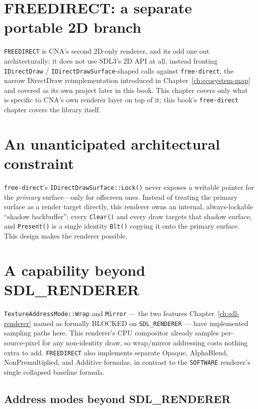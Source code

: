 \section{FREEDIRECT: a separate portable 2D branch}

\texttt{FREEDIRECT} is CNA's second 2D-only renderer, and its odd one out architecturally: it does
not use SDL3's 2D API at all, instead fronting \texttt{IDirectDraw} / \texttt{IDirectDrawSurface}-shaped
calls against \texttt{free-direct}, the narrow DirectDraw reimplementation introduced in
Chapter~\ref{ch:ecosystem-map} and covered as its own project later in this book. This chapter
covers only what is specific to CNA's own renderer layer on top of it; this book's
\texttt{free-direct} chapter covers the library itself.

\section{An unanticipated architectural constraint}
\label{sec:freedirect-shadow-backbuffer}

\texttt{free-direct}'s \texttt{IDirectDrawSurface::Lock()} never exposes a writable
pointer for the \emph{primary} surface---only for offscreen ones. Instead of treating the
primary surface as a render target directly, this renderer owns an internal, always-lockable
``shadow backbuffer'': every \texttt{Clear()} and every  draw targets
that shadow surface, and \texttt{Present()} is a single identity \texttt{Blt()} copying it
onto the primary surface. This design makes the renderer possible.

\section{A capability beyond SDL\_RENDERER}

\texttt{TextureAddressMode::Wrap} and \texttt{Mirror} --- the two features
Chapter~\ref{ch:sdl-renderer} named as formally BLOCKED on \texttt{SDL\_RENDERER} --- have
implemented sampling paths here. This renderer's CPU compositor
already samples per-source-pixel for any non-identity draw, so wrap/mirror addressing costs
nothing extra to add. \texttt{FREEDIRECT} also implements separate Opaque, AlphaBlend,
NonPremultiplied, and Additive formulas, in contrast to
the \texttt{SOFTWARE} renderer's single collapsed baseline formula.

\subsection{Address modes beyond SDL\_RENDERER}

